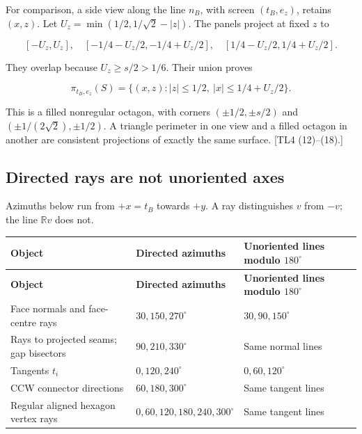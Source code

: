 \documentclass[11pt,a4paper]{article}
\begin{document}
For comparison, a side view along the line \(n_B\), with screen \((t_B,e_z)\), retains \((x,z)\). Let \(U_z=\min(1/2,1/\sqrt2-|z|)\). The panels project at fixed \(z\) to

\[
[-U_z,U_z],\quad[-1/4-U_z/2,-1/4+U_z/2],\quad
[1/4-U_z/2,1/4+U_z/2].
\]

They overlap because \(U_z\ge s/2>1/6\). Their union proves

\[
\pi_{t_B,e_z}(S)=\{(x,z):|z|\le1/2,\ |x|\le1/4+U_z/2\}.
\tag{M13}\label{eq:M13}
\]

This is a filled nonregular octagon, with corners \((\pm1/2,\pm s/2)\) and \((\pm1/(2\sqrt2),\pm1/2)\). A triangle perimeter in one view and a filled octagon in another are consistent projections of exactly the same surface. [TL4 (12)--(18).]

\subsection{Directed rays are not unoriented axes}

Azimuths below run from \(+x=t_B\) towards \(+y\). A ray distinguishes \(v\) from \(-v\); the line \(\mathbb Rv\) does not.

\begingroup\small\setlength{\LTpre}{5pt}\setlength{\LTpost}{7pt}
\begin{longtable}{@{}>{\raggedright\arraybackslash}p{0.2500\dimexpr\textwidth-24pt\relax}>{\raggedright\arraybackslash}p{0.3700\dimexpr\textwidth-24pt\relax}>{\raggedright\arraybackslash}p{0.3800\dimexpr\textwidth-24pt\relax}@{}}
\toprule
\textbf{Object} & \textbf{Directed azimuths} & \textbf{Unoriented lines modulo \(180^\circ\)}\\ \midrule
\endfirsthead
\textbf{Object} & \textbf{Directed azimuths} & \textbf{Unoriented lines modulo \(180^\circ\)}\\ \midrule
\endhead
\bottomrule\endfoot
Face normals and face-centre rays & \(30,150,270^\circ\) & \(30,90,150^\circ\)\\[4pt]
Rays to projected seams; gap bisectors & \(90,210,330^\circ\) & Same normal lines\\[4pt]
Tangents \(t_i\) & \(0,120,240^\circ\) & \(0,60,120^\circ\)\\[4pt]
CCW connector directions & \(60,180,300^\circ\) & Same tangent lines\\[4pt]
Regular aligned hexagon vertex rays & \(0,60,120,180,240,300^\circ\) & Same tangent lines\\[4pt]
\end{longtable}\endgroup
\end{document}
